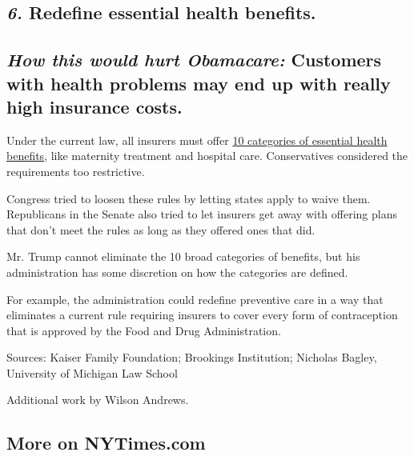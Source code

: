 \hypertarget{6-redefine-essential-health-benefits}{%
\subsection{\texorpdfstring{\emph{\textbf{6.}} \textbf{Redefine
essential health
benefits.}}{6. Redefine essential health benefits.}}\label{6-redefine-essential-health-benefits}}

\hypertarget{how-this-would-hurt-obamacare-customers-with-health-problems-may-end-up-with-really-high-insurance-costs}{%
\subsection{\texorpdfstring{\emph{How this would hurt Obamacare:}
Customers with health problems may end up with really high insurance
costs.}{How this would hurt Obamacare: Customers with health problems may end up with really high insurance costs.}}\label{how-this-would-hurt-obamacare-customers-with-health-problems-may-end-up-with-really-high-insurance-costs}}

Under the current law, all insurers must offer
\href{https://www.nytimes3xbfgragh.onion/interactive/2017/03/24/us/essential-health-benefits.html}{10
categories of essential health benefits}, like maternity treatment and
hospital care. Conservatives considered the requirements too
restrictive.

Congress tried to loosen these rules by letting states apply to waive
them. Republicans in the Senate also tried to let insurers get away with
offering plans that don't meet the rules as long as they offered ones
that did.

Mr. Trump cannot eliminate the 10 broad categories of benefits, but his
administration has some discretion on how the categories are defined.

For example, the administration could redefine preventive care in a way
that eliminates a current rule requiring insurers to cover every form of
contraception that is approved by the Food and Drug Administration.

Sources: Kaiser Family Foundation; Brookings Institution; Nicholas
Bagley, University of Michigan Law School

Additional work by Wilson Andrews.

\hypertarget{more-on-nytimescom}{%
\subsection{More on NYTimes.com}\label{more-on-nytimescom}}


